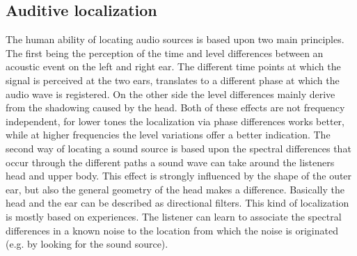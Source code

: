 \documentclass[a4paper,11pt]{article}%
\renewcommand{\\}{\vspace*{0.5\baselineskip} \newline}
\begin{document}
\subsection{Auditive localization}
The human ability of locating audio sources is based upon two main principles. The first being the perception of the time and level differences between an acoustic event on the left and right ear. The different time points at which the signal is perceived at the two ears, translates to a different phase at which the audio wave is registered. On the other side the level differences mainly derive from the shadowing caused by the head. Both of these effects are not frequency independent, for lower tones the localization via phase differences works better, while at higher frequencies the level variations offer a better indication.
\newline
\newline
The second way of locating a sound source is based upon the spectral differences that occur through the different paths a sound wave can take around the listeners head and upper body. This effect is strongly influenced by the shape of the outer ear, but also the general geometry of the head makes a difference. Basically the head and the ear can be described as directional filters. This kind of localization is mostly based on experiences. The listener can learn to associate the spectral differences in a known noise to the location from which the noise is originated (e.g. by looking for the sound source).



\end{document}
